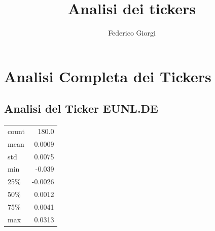 \documentclass{article}%
\title{Analisi dei tickers}%
\author{Federico Giorgi}%
\date{}%
\begin{document}
%
\normalsize%
\maketitle%
\section*{Analisi Completa dei Tickers}%
\label{sec:AnalisiCompletadeiTickers}%
\subsection*{Analisi del Ticker EUNL.DE}%
\label{subsec:AnalisidelTickerEUNL.DE}%
\begin{tabular}{lr}%
count&180.0\\%
mean&0.0009\\%
std&0.0075\\%
min&{-}0.039\\%
25\%&{-}0.0026\\%
50\%&0.0012\\%
75\%&0.0041\\%
max&0.0313\\%
\end{tabular}%
\end{document}

